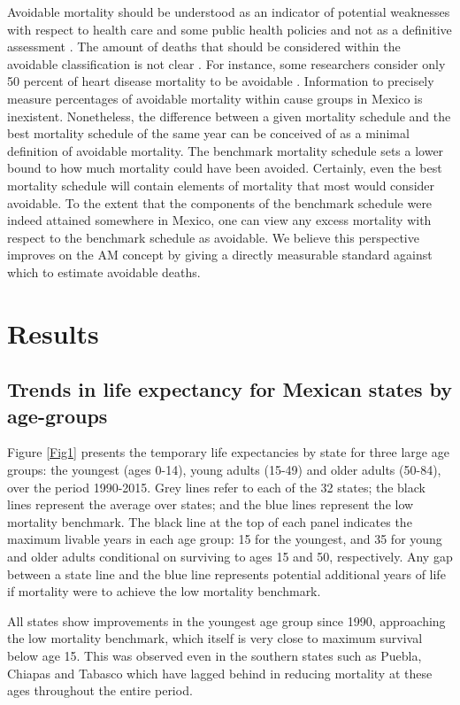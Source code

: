 \documentclass{bmcart}
\begin{document}
Avoidable mortality should be understood as an indicator of potential
weaknesses with respect to health care and some public health policies and not
as a definitive assessment \cite{nolte&mckee2008}. The amount of deaths that should be considered within the avoidable classification is not clear \cite{beltran2011avoidable}. For instance, some researchers consider only 50 percent of heart disease mortality to be avoidable \cite{nolte2012amenable, holland2003}. Information to precisely
measure percentages of avoidable mortality within cause groups in Mexico is inexistent. Nonetheless, the
difference between a given mortality schedule and the best mortality schedule of
the same year can be conceived of as a minimal definition of avoidable
mortality. The benchmark mortality schedule sets a lower bound to how much mortality could have been avoided. Certainly, even the best mortality schedule will contain elements of mortality that
most would consider avoidable. To the extent that the components of the benchmark schedule were indeed
attained somewhere in Mexico, one can view any excess mortality
with respect to the benchmark schedule as avoidable. We believe this perspective improves on the AM concept by giving a directly measurable standard against which to estimate avoidable deaths.

\section*{Results}

\subsection*{Trends in life expectancy for Mexican states by age-groups}

Figure \ref{Fig1} presents the temporary life expectancies by state for three large age groups: the youngest (ages 0-14), young
adults (15-49) and older adults (50-84), over the period 1990-2015. Grey lines
refer to each of the 32 states; the black lines represent the average over
states; and the blue lines represent the low mortality benchmark. The black line
at the top of each panel indicates the maximum livable years in each age group: 15 for the youngest, and 35 for young and older adults conditional on surviving to ages 15 and 50, respectively. Any gap between a state line and the blue line represents potential additional years of life if mortality were to achieve the low mortality benchmark.

All states show improvements in the youngest age group since 1990, approaching the low mortality benchmark, which itself is very close to maximum survival below age 15. This was observed even in the southern states such as Puebla, Chiapas and Tabasco which have lagged behind in reducing mortality at these ages throughout the entire period. 	
\end{document}
